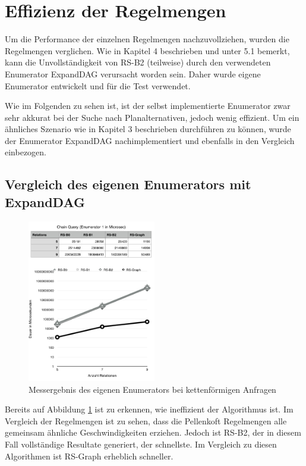 \section{Effizienz der Regelmengen}

Um die Performance der einzelnen Regelmengen nachzuvollziehen, wurden die Regelmengen verglichen. Wie in Kapitel 4 beschrieben und unter 5.1 bemerkt, kann die Unvollständigkeit von RS-B2 (teilweise) durch den verwendeten Enumerator ExpandDAG verursacht worden sein. Daher wurde eigene Enumerator entwickelt und für die Test verwendet.

Wie im Folgenden zu sehen ist, ist der selbst implementierte Enumerator zwar sehr akkurat bei der Suche nach Planalternativen, jedoch wenig effizient. Um ein ähnliches Szenario wie in Kapitel 3 beschrieben durchführen zu können, wurde der Enumerator ExpandDAG nachimplementiert und ebenfalls in den Vergleich einbezogen.

\subsection{Vergleich des eigenen Enumerators mit ExpandDAG}


\begin{figure}[ht]
  \centering
  \includegraphics[width=0.5\textwidth]{05_ResultsEvaluation/00_media/ChainEnumerator1.png}
  \caption{Messergebnis des eigenen Enumerators bei kettenförmigen Anfragen}
  \label{chainQuery1}
\end{figure}

Bereits auf Abbildung \ref{chainQuery1} ist zu erkennen, wie ineffizient der Algorithmus ist. Im Vergleich der Regelmengen ist zu sehen, dass die Pellenkoft Regelmengen alle gemeinsam ähnliche Geschwindigkeiten erziehen. Jedoch ist RS-B2, der in diesem Fall vollständige Resultate generiert, der schnellste. Im Vergleich zu diesen Algorithmen ist RS-Graph erheblich schneller.


